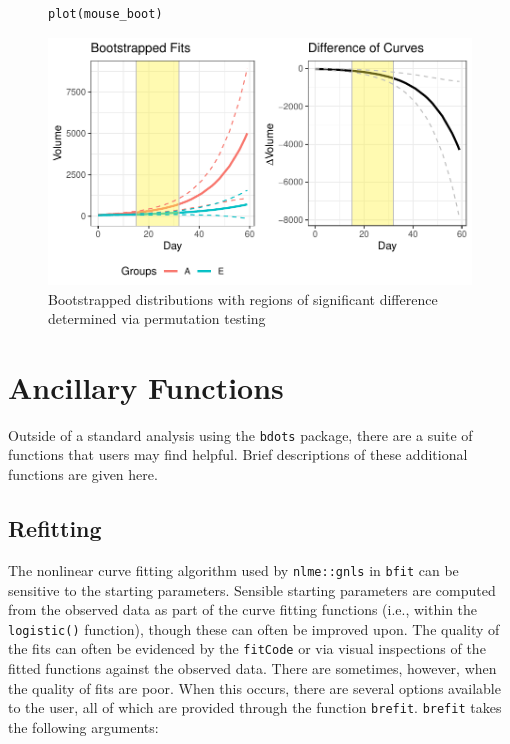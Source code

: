 \documentclass{article}
\newcommand{\xt}{\texttt}%
\begin{document}
\begin{figure}[H]
\centering
\begin{BVerbatim}
plot(mouse_boot)
\end{BVerbatim}

\includegraphics{img/mouse_boot_plot.pdf}
\caption{Bootstrapped distributions with regions of significant difference determined via permutation testing}
\end{figure}
%
%
%
%


\section{Ancillary Functions}\label{sec:anc_func}

Outside of a standard analysis using the \xt{bdots} package, there are a suite of functions that users may find helpful. Brief descriptions of these additional functions are given here. 


\subsection{Refitting}

The nonlinear curve fitting algorithm used by \xt{nlme::gnls} in \xt{bfit} can be sensitive to the starting parameters. Sensible starting parameters are computed from the observed data as part of the curve fitting functions (i.e., within the \xt{logistic()} function), though these can often be improved upon. The quality of the fits can often be evidenced by the \xt{fitCode} or via  visual inspections of the fitted functions against the observed data. There are sometimes, however, when the quality of fits are poor. When this occurs, there are several options available to the user, all of which are provided through the function \xt{brefit}. \xt{brefit} takes the following arguments:
\end{document}
